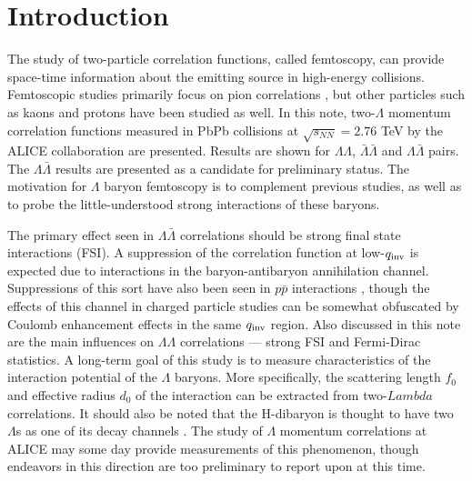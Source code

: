 %
\tableofcontents
\listoffigures
\pagebreak
\section{Introduction}



The study of two-particle correlation functions, called femtoscopy, can provide space-time information about the emitting source in high-energy collisions.  Femtoscopic studies primarily focus on pion correlations \cite{Aamodt:2011mr}, but other particles such as kaons \cite{Abelev:2012ms} and protons \cite{Gos:2007cj} have been studied as well. In this note, two-$\Lambda$ momentum correlation functions measured in PbPb collisions at $\sqrt{s_{NN}}=2.76$ TeV by the ALICE collaboration are presented.  Results are shown for $\Lambda\Lambda$, $\bar{\Lambda}\bar{\Lambda}$ and $\Lambda\bar{\Lambda}$ pairs. The $\Lambda\bar{\Lambda}$ results are presented as a candidate for preliminary status. The motivation for $\Lambda$ baryon femtoscopy is to complement previous studies, as well as to probe the little-understood strong interactions of these baryons.


The primary effect seen in $\Lambda\bar{\Lambda}$ correlations should be strong final state interactions (FSI).  A suppression of the correlation function at low-$q_{\rm inv}$ is expected due to interactions in the baryon-antibaryon annihilation channel.  Suppressions of this sort have also been seen in $p \bar{p}$ interactions \cite{Gos:2007cj}, though the effects of this channel in charged particle studies can be somewhat obfuscated by Coulomb enhancement effects in the same $q_{\rm inv}$ region.  Also discussed in this note are the main influences on $\Lambda\Lambda$ correlations --- strong FSI and Fermi-Dirac statistics.  A long-term goal of this study is to measure characteristics of the interaction potential of the $\Lambda$ baryons.  More specifically, the scattering length $f_0$ and effective radius $d_0$ of the interaction can be extracted from two-$Lambda$ correlations. It should also be noted that the H-dibaryon is thought to have two $\Lambda$s as one of its decay channels \cite{PhysRevLett.38.195}.  The study of $\Lambda$ momentum correlations at ALICE may some day provide measurements of this phenomenon, though endeavors in this direction are too preliminary to report upon at this time.

